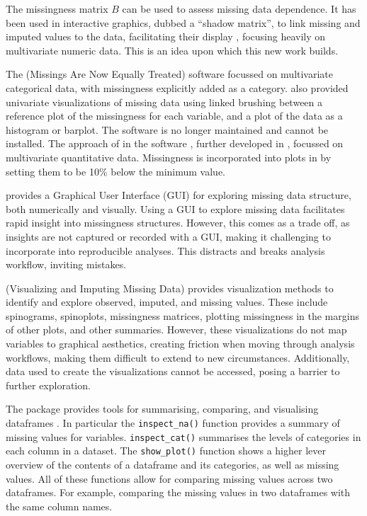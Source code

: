 \documentclass[
]{jss}
\begin{document}
The missingness matrix \(B\) can be used to assess missing data dependence. It has been used in interactive graphics, dubbed a ``shadow matrix'', to link missing and imputed values to the data, facilitating their display \citep{Swayne1998}, focusing heavily on multivariate numeric data. This is an idea upon which this new work builds.

The  (Missings Are Now Equally Treated) software \citep{Unwin1996} focussed on multivariate categorical data, with missingness explicitly added as a category.  also provided univariate visualizations of missing data using linked brushing between a reference plot of the missingness for each variable, and a plot of the data as a histogram or barplot. The  software is no longer maintained and cannot be installed. The approach of \citep{Swayne1998} in the software , further developed in  \citep{Cook2007}, focussed on multivariate quantitative data. Missingness is incorporated into plots in  by setting them to be 10\% below the minimum value.

 provides a Graphical User Interface (GUI) for exploring missing data structure, both numerically and visually. Using a GUI to explore missing data facilitates rapid insight into missingness structures. However, this comes as a trade off, as insights are not captured or recorded with a GUI, making it challenging to incorporate into reproducible analyses. This distracts and breaks analysis workflow, inviting mistakes.

 (Visualizing and Imputing Missing Data) provides visualization methods to identify and explore observed, imputed, and missing values. These include spinograms, spinoplots, missingness matrices, plotting missingness in the margins of other plots, and other summaries. However, these visualizations do not map variables to graphical aesthetics, creating friction when moving through analysis workflows, making them difficult to extend to new circumstances. Additionally, data used to create the visualizations cannot be accessed, posing a barrier to further exploration.

The  package provides tools for summarising, comparing, and visualising dataframes \citep{inspectdf}. In particular the \texttt{inspect\_na()} function provides a summary of missing values for variables. \texttt{inspect\_cat()} summarises the levels of categories in each column in a dataset. The \texttt{show\_plot()} function shows a higher lever overview of the contents of a dataframe and its categories, as well as missing values. All of these functions allow for comparing missing values across two dataframes. For example, comparing the missing values in two dataframes with the same column names.
\end{document}

